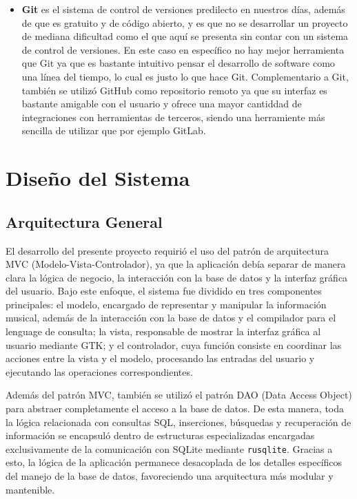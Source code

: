 \documentclass[12pt]{article}
\begin{document}
\begin{itemize}
    \item \textbf{Git} es el sistema de control de versiones predilecto en nuestros días, además de que es gratuito y de código abierto, y es que no se desarrollar un proyecto de mediana dificultad como el que aquí se presenta sin contar con un sistema de control de versiones. En este caso en específico no hay mejor herramienta que Git ya que es bastante intuitivo pensar el desarrollo de software como una línea del tiempo, lo cual es justo lo que hace Git. Complementario a Git, también se utilizó GitHub como repositorio remoto ya que su interfaz es bastante amigable con el usuario y ofrece una mayor cantiddad de integraciones con herramientas de terceros, siendo una herramiente más sencilla de utilizar que por ejemplo GitLab.
\end{itemize}

\section{Diseño del Sistema}

\subsection{Arquitectura General}

El desarrollo del presente proyecto requirió el uso del patrón de arquitectura MVC (Modelo-Vista-Controlador), ya que la aplicación debía separar de manera clara la lógica de negocio, la interacción con la base de datos y la interfaz gráfica del usuario. Bajo este enfoque, el sistema fue dividido en tres componentes principales: el modelo, encargado de representar y manipular la información musical, además de la interacción con la base de datos y el compilador para el lenguage de consulta; la vista, responsable de mostrar la interfaz gráfica al usuario mediante GTK; y el controlador, cuya función consiste en coordinar las acciones entre la vista y el modelo, procesando las entradas del usuario y ejecutando las operaciones correspondientes.

Además del patrón MVC, también se utilizó el patrón DAO (Data Access Object) para abstraer completamente el acceso a la base de datos. De esta manera, toda la lógica relacionada con consultas SQL, inserciones, búsquedas y recuperación de información se encapsuló dentro de estructuras especializadas encargadas exclusivamente de la comunicación con SQLite mediante \texttt{rusqlite}. Gracias a esto, la lógica de la aplicación permanece desacoplada de los detalles específicos del manejo de la base de datos, favoreciendo una arquitectura más modular y mantenible.
\end{document}
